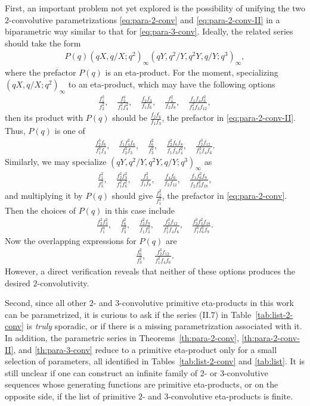 \documentclass[12pt,reqno]{amsart}
\numberwithin{equation}{section}
\theoremstyle{plain}
\theoremstyle{definition}
\theoremstyle{named}
\begin{document}
First, an important problem not yet explored is the possibility of unifying the two $2$-convolutive parametrizations \eqref{eq:para-2-conv} and \eqref{eq:para-2-conv-II} in a biparametric way similar to that for \eqref{eq:para-3-conv}. Ideally, the related series should take the form
\begin{align*}
    P(q)(qX,q/X;q^2)_\infty(qY,q^2/Y,q^2Y,q/Y;q^3)_\infty,
\end{align*}
where the prefactor $P(q)$ is an eta-product. For the moment, specializing $(qX,q/X;q^2)_\infty$ to an eta-product, which may have the following options
\begin{align*}
    \frac{f_1^2}{f_2^2},\quad \frac{f_2^4}{f_1^2 f_4^2},\quad \frac{f_2 f_3}{f_1 f_6},\quad \frac{f_4^2}{f_2 f_8},\quad \frac{f_1 f_4 f_6^2}{f_2^2 f_3 f_{12}},
\end{align*}
then its product with $P(q)$ should be $\frac{f_2 f_6}{f_1 f_3}$, the prefactor in \eqref{eq:para-2-conv-II}. Thus, $P(q)$ is one of
\begin{align*}
    \frac{f_2^3 f_6}{f_1^3 f_3},\quad\frac{f_1 f_4^2 f_6}{f_2^3 f_3},\quad\frac{f_6^2}{f_3^2},\quad\frac{f_2^2 f_6 f_8}{f_1 f_3 f_4^2},\quad\frac{f_2^3 f_{12}}{f_1^2 f_4 f_6}.
\end{align*}
Similarly, we may specialize $(qY,q^2/Y,q^2Y,q/Y;q^3)_\infty$ as
\begin{align*}
    \frac{f_1^2}{f_3^2},\quad \frac{f_2^2 f_3^2}{f_1^2 f_6^2},\quad \frac{f_3^2}{f_1 f_9},\quad \frac{f_4 f_6}{f_2 f_{12}},\quad \frac{f_1 f_6^2 f_9}{f_2 f_3^2 f_{18}},
\end{align*}
and multiplying it by $P(q)$ should give $\frac{f_2^2}{f_1^2}$, the prefactor in \eqref{eq:para-2-conv}. Then the choices of $P(q)$ in this case include
\begin{align*}
    \frac{f_2^2 f_3^2}{f_1^4},\quad \frac{f_6^2}{f_3^2},\quad \frac{f_2^2 f_9}{f_1 f_3^2},\quad \frac{f_2^3 f_{12}}{f_1^2 f_4 f_6},\quad \frac{f_2^3 f_3^2 f_{18}}{f_1^3 f_6^2 f_9}.
\end{align*}
Now the overlapping expressions for $P(q)$ are
\begin{align*}
    \frac{f_6^2}{f_3^2},\quad \frac{f_2^3 f_{12}}{f_1^2 f_4 f_6}.
\end{align*}
However, a direct verification reveals that neither of these options produces the desired $2$-convolutivity.

Second, since all other $2$- and $3$-convolutive primitive eta-products in this work can be parametrized, it is curious to ask if the series (II.7) in Table~\ref{tab:list-2-conv} is \emph{truly} sporadic, or if there is a missing parametrization associated with it. In addition, the parametric series in Theorems~\ref{th:para-2-conv}, \ref{th:para-2-conv-II}, and \ref{th:para-3-conv} reduce to a primitive eta-product only for a small selection of parameters, all identified in Tables~\ref{tab:list-2-conv} and \ref{tab:list}. It is still unclear if one can construct an infinite family of $2$- or $3$-convolutive sequences whose generating functions are primitive eta-products, or on the opposite side, if the list of primitive $2$- and $3$-convolutive eta-products is finite.
\end{document}
